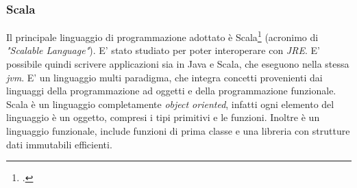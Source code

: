 \subsubsection{Scala}
Il principale linguaggio di programmazione adottato è Scala\footcite{http://www.scala-lang.org/} (acronimo di \emph{"Scalable Language"}). E' stato studiato per poter interoperare con \emph{JRE}. E' possibile quindi scrivere applicazioni sia in Java e Scala, che eseguono nella stessa \emph{\gls{jvm}}. E' un linguaggio multi paradigma, che integra concetti provenienti dai linguaggi della programmazione ad oggetti e della programmazione funzionale. Scala è un linguaggio completamente \emph{object oriented}, infatti ogni elemento del linguaggio è un oggetto, compresi i tipi primitivi e le funzioni. Inoltre è un linguaggio funzionale, include funzioni di prima classe e una libreria con strutture dati immutabili efficienti.
